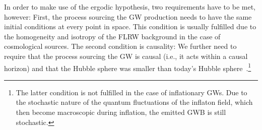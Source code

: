 In order to make use of the ergodic hypothesis, two requirements have to be met, however:  First, the process sourcing the \ac{GW} production needs to have the same initial conditions at every point in space. This condition is usually fulfilled due to the homogeneity and isotropy of the \ac{FLRW} background in the case of cosmological sources. The second condition is causality: We further need to require that the  process sourcing the \ac{GW} is causal (i.e., it acts within a causal horizon) and that the Hubble sphere was smaller than today's Hubble sphere~\cite{Caprini:2018mtu}.\footnote{The latter condition is not fulfilled in the case of inflationary \acp{GW}. Due to the stochastic nature of the quantum fluctuations of the inflaton field, which then become macroscopic during inflation, the emitted \ac{GWB} is still stochastic.}

